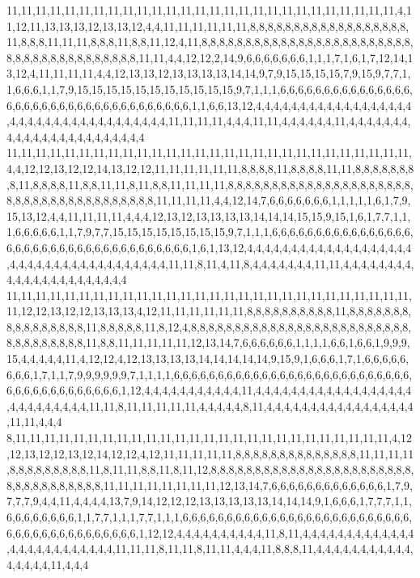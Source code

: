 11,11,11,11,11,11,11,11,11,11,11,11,11,11,11,11,11,11,11,11,11,11,11,11,11,11,11,4,11,12,11,13,13,13,12,13,13,12,4,4,11,11,11,11,11,11,8,8,8,8,8,8,8,8,8,8,8,8,8,8,8,8,8,8,11,8,8,8,11,11,11,8,8,8,11,8,8,11,12,4,11,8,8,8,8,8,8,8,8,8,8,8,8,8,8,8,8,8,8,8,8,8,8,8,8,8,8,8,8,8,8,8,8,8,8,8,8,8,8,8,11,11,4,4,12,12,2,14,9,6,6,6,6,6,6,6,1,1,1,7,1,6,1,7,12,14,13,12,4,11,11,11,11,4,4,12,13,13,12,13,13,13,13,14,14,9,7,9,15,15,15,15,7,9,15,9,7,7,1,1,6,6,6,1,1,7,9,15,15,15,15,15,15,15,15,15,15,15,9,7,1,1,1,6,6,6,6,6,6,6,6,6,6,6,6,6,6,6,6,6,6,6,6,6,6,6,6,6,6,6,6,6,6,6,6,6,6,6,6,1,1,6,6,13,12,4,4,4,4,4,4,4,4,4,4,4,4,4,4,4,4,4,4,4,4,4,4,4,4,4,4,4,4,4,4,4,4,4,4,4,4,11,11,11,11,4,4,4,11,11,4,4,4,4,4,4,11,4,4,4,4,4,4,4,4,4,4,4,4,4,4,4,4,4,4,4,4,4,4,4
11,11,11,11,11,11,11,11,11,11,11,11,11,11,11,11,11,11,11,11,11,11,11,11,11,11,11,11,4,4,12,12,13,12,12,14,13,12,12,11,11,11,11,11,11,8,8,8,8,11,8,8,8,8,11,11,8,8,8,8,8,8,8,8,11,8,8,8,8,11,8,8,11,11,8,11,8,8,11,11,11,11,8,8,8,8,8,8,8,8,8,8,8,8,8,8,8,8,8,8,8,8,8,8,8,8,8,8,8,8,8,8,8,8,8,8,8,8,8,8,11,11,11,11,4,4,12,14,7,6,6,6,6,6,6,6,1,1,1,1,1,6,1,7,9,15,13,12,4,4,11,11,11,11,4,4,4,12,13,12,13,13,13,13,14,14,14,15,15,9,15,1,6,1,7,7,1,1,1,6,6,6,6,6,1,1,7,9,7,7,15,15,15,15,15,15,15,15,9,7,1,1,1,6,6,6,6,6,6,6,6,6,6,6,6,6,6,6,6,6,6,6,6,6,6,6,6,6,6,6,6,6,6,6,6,6,6,6,6,6,1,6,1,13,12,4,4,4,4,4,4,4,4,4,4,4,4,4,4,4,4,4,4,4,4,4,4,4,4,4,4,4,4,4,4,4,4,4,4,4,4,4,11,11,8,11,4,11,8,4,4,4,4,4,4,4,11,11,4,4,4,4,4,4,4,4,4,4,4,4,4,4,4,4,4,4,4,4,4,4
11,11,11,11,11,11,11,11,11,11,11,11,11,11,11,11,11,11,11,11,11,11,11,11,11,11,11,11,11,12,12,13,12,12,13,13,13,4,12,11,11,11,11,11,11,8,8,8,8,8,8,8,8,8,8,11,8,8,8,8,8,8,8,8,8,8,8,8,8,8,8,8,11,8,8,8,8,8,11,8,12,4,8,8,8,8,8,8,8,8,8,8,8,8,8,8,8,8,8,8,8,8,8,8,8,8,8,8,8,8,8,8,8,8,8,8,11,8,8,11,11,11,11,11,12,13,14,7,6,6,6,6,6,6,1,1,1,1,6,6,1,6,6,1,9,9,9,15,4,4,4,4,4,11,4,12,12,4,12,13,13,13,13,14,14,14,14,14,9,15,9,1,6,6,6,1,7,1,6,6,6,6,6,6,6,6,1,7,1,1,7,9,9,9,9,9,9,7,1,1,1,1,6,6,6,6,6,6,6,6,6,6,6,6,6,6,6,6,6,6,6,6,6,6,6,6,6,6,6,6,6,6,6,6,6,6,6,6,6,6,6,6,1,12,4,4,4,4,4,4,4,4,4,4,4,11,4,4,4,4,4,4,4,4,4,4,4,4,4,4,4,4,4,4,4,4,4,4,4,4,4,4,4,11,11,8,11,11,11,11,11,4,4,4,4,4,8,11,4,4,4,4,4,4,4,4,4,4,4,4,4,4,4,4,4,11,11,4,4,4
8,11,11,11,11,11,11,11,11,11,11,11,11,11,11,11,11,11,11,11,11,11,11,11,11,11,11,4,12,12,13,12,12,13,12,14,12,12,4,12,11,11,11,11,11,8,8,8,8,8,8,8,8,8,8,8,8,8,8,11,11,11,11,8,8,8,8,8,8,8,8,8,11,8,11,11,8,8,11,8,11,12,8,8,8,8,8,8,8,8,8,8,8,8,8,8,8,8,8,8,8,8,8,8,8,8,8,8,8,8,8,8,8,8,8,8,11,11,11,11,11,11,11,11,12,13,14,7,6,6,6,6,6,6,6,6,6,6,6,6,6,1,7,9,7,7,7,9,4,4,11,4,4,4,4,13,7,9,14,12,12,12,13,13,13,13,13,14,14,14,9,1,6,6,6,1,7,7,7,1,1,6,6,6,6,6,6,6,6,1,1,7,7,1,1,1,7,7,1,1,1,6,6,6,6,6,6,6,6,6,6,6,6,6,6,6,6,6,6,6,6,6,6,6,6,6,6,6,6,6,6,6,6,6,6,6,6,6,6,6,6,6,1,12,12,4,4,4,4,4,4,4,4,4,4,11,8,11,4,4,4,4,4,4,4,4,4,4,4,4,4,4,4,4,4,4,4,4,4,4,4,4,4,11,11,11,8,11,11,8,11,11,4,4,4,11,8,8,8,11,4,4,4,4,4,4,4,4,4,4,4,4,4,4,4,4,11,4,4,4

